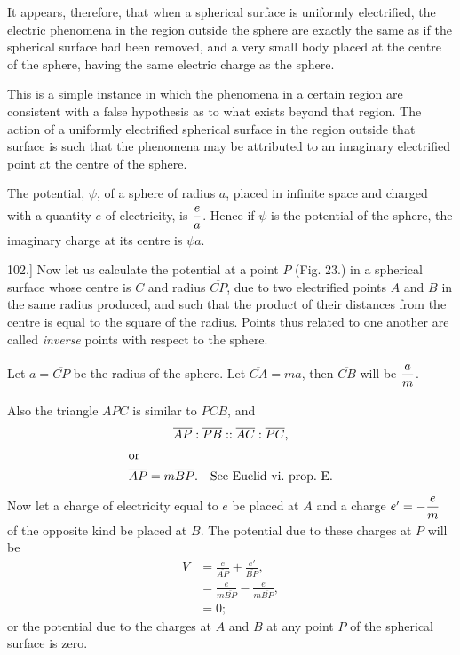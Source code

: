 \documentclass[12pt,oneside]{book}[2021/10/04]
\newcommand{\Runhead}[1]{\fancyhead[C]{\iffloatpage{}{\small#1}}}
\newcommand{\article}[1]{\phantomsection \label{art:#1}{#1.]}}
\newcommand{\xp}{\rule[-2.0ex]{0pt}{5.2ex}}
\newcommand{\¬}{\hphantom{0}}
\begin{document}
It appears, therefore, that when a spherical surface is uniformly
electrified, the electric phenomena in the region outside the sphere
are exactly the same as if the spherical surface had been removed,
and a very small body placed at the centre of the sphere, having
the same electric charge as the sphere.
\Runhead{CONCENTRIC SPHERES.}

This is a simple instance in which the phenomena in a certain
region are consistent with a false hypothesis as to what exists
beyond that region. The action of a uniformly electrified spherical
surface in the region outside that surface is such that the phenomena
may be attributed to an imaginary electrified point at the centre of
the sphere.

The potential, \(\psi\), of a sphere of radius \(a\), placed in infinite space
and charged with a quantity \(e\) of electricity, is \(\xp\dfrac{e}{a}\). Hence if \(\psi\) is
the potential of the sphere, the imaginary charge at its centre
is \(\psi a\).

\article{102} Now let us calculate the potential at a point \(P\) (Fig. 23.)
in a spherical surface whose centre is \(C\) and radius \(\overline{CP}\), due to two
electrified points \(A\) and \(B\) in the same radius produced, and such
that the product of their distances from the centre is equal to the
square of the radius. Points thus related to one another are called
\textit{inverse} points with respect to the sphere.

Let \(a = \overline{CP}\) be the radius of the sphere. Let \(\overline{CA} = ma\), then \(\overline{CB}\)
will be \(\xp\dfrac{a}{m}\).

Also the triangle \(APC\) is similar to \(PCB\), and
\begin{gather*}
\overline{AP} : \overline{PB} : : \overline{AC} : \overline{PC}\text{,}\\
\shortintertext{or}
\overline{AP} = m \overline{BP}\text{.\quad See Euclid vi.\ prop.\ E.}
\end{gather*}
Now let a charge of electricity equal to \(e\) be placed at \(A\) and a
charge \(e'= -\xp\dfrac{e}{m}\) of the opposite kind be placed at \(B\). The potential
due to these charges at \(P\) will be
\begin{align*}
V &= \frac{e}{\overline{AP}} + \frac{e'}{\overline{BP}},\\
&= \frac{e}{m \overline{BP}} - \frac{e}{m \overline{BP}},\\
&= 0;
\end{align*}
or the potential due to the charges at \(A\) and \(B\) at any point \(P\) of the
spherical surface is zero.
\end{document}
